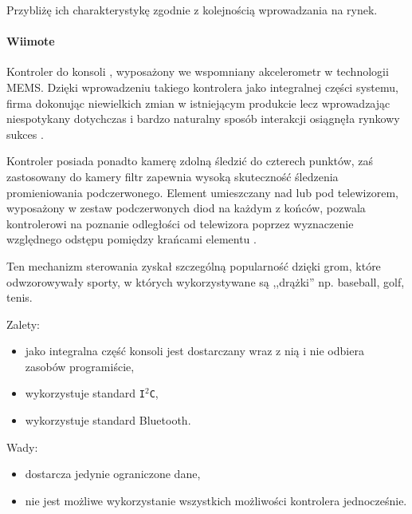Przybliżę ich charakterystykę zgodnie z kolejnością wprowadzania na rynek.

\paragraph{Wiimote}
Kontroler do konsoli , wyposażony we wspomniany akcelerometr w technologii MEMS. Dzięki wprowadzeniu takiego kontrolera jako integralnej części systemu, firma  dokonując  niewielkich zmian w istniejącym produkcie \ppauza {} \ppauza lecz wprowadzając niespotykany dotychczas i bardzo naturalny sposób interakcji osiągnęła rynkowy sukces \citep{WiiSales}.

Kontroler posiada ponadto kamerę zdolną śledzić do czterech punktów, zaś zastosowany do kamery filtr zapewnia wysoką skuteczność śledzenia promieniowania podczerwonego. Element  umieszczany nad lub pod telewizorem, wyposażony w zestaw podczerwonych diod na każdym z końców, pozwala kontrolerowi na poznanie odległości od telewizora poprzez wyznaczenie względnego odstępu pomiędzy krańcami elementu .

Ten mechanizm sterowania zyskał szczególną popularność dzięki grom, które odwzorowywały sporty, w których wykorzystywane są ,,drążki'' \ppauza np. baseball, golf, tenis.

Zalety:
\begin{itemize}
  \item jako integralna część konsoli jest dostarczany wraz z nią i nie odbiera zasobów programiście,
  \item wykorzystuje standard \texttt{I$^2$C},
  \item wykorzystuje standard Bluetooth.
\end{itemize}

Wady:
\begin{itemize}
  \item dostarcza jedynie ograniczone dane,
  \item nie jest możliwe wykorzystanie wszystkich możliwości kontrolera jednocześnie.
\end{itemize}

